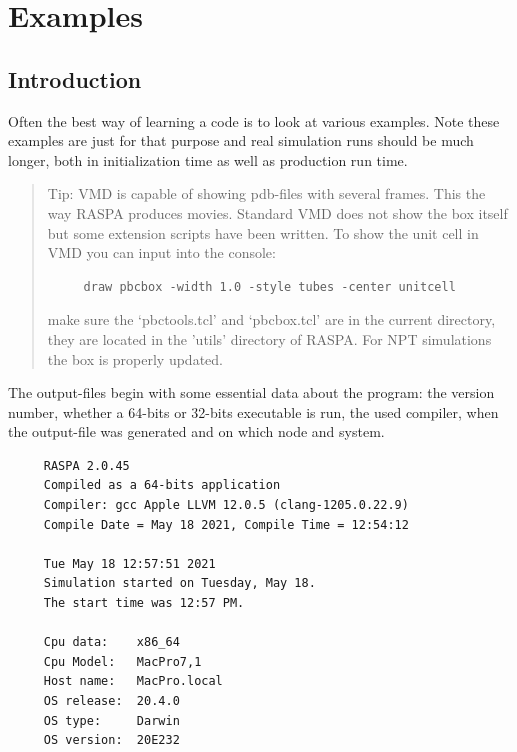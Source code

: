 \chapter{Examples\label{Examples: chapter}}

\section{Introduction}

Often the best way of learning a code is to look at various examples. Note these examples are just for that purpose
and real simulation runs should be much longer, both in initialization time as well as production run time.

\begin{quote}
Tip: VMD is capable of showing pdb-files with several frames. This the way RASPA produces movies. Standard VMD does
not show the box itself but some extension scripts have been written. To show the unit cell in VMD you can
input into the console:
\begin{verbatim}
     draw pbcbox -width 1.0 -style tubes -center unitcell
\end{verbatim}
make sure the `pbctools.tcl' and `pbcbox.tcl' are in the current directory, they are located in the 'utils' directory of RASPA.
For NPT simulations the box is properly updated.
\end{quote}

The output-files begin with some essential data about the program: the version number, whether a 64-bits or 32-bits executable is run,
the used compiler, when the output-file was generated and on which node and system.
\begin{verbatim}
     RASPA 2.0.45
     Compiled as a 64-bits application
     Compiler: gcc Apple LLVM 12.0.5 (clang-1205.0.22.9)
     Compile Date = May 18 2021, Compile Time = 12:54:12
     
     Tue May 18 12:57:51 2021
     Simulation started on Tuesday, May 18.
     The start time was 12:57 PM.
     
     Cpu data:    x86_64
     Cpu Model:   MacPro7,1
     Host name:   MacPro.local
     OS release:  20.4.0
     OS type:     Darwin
     OS version:  20E232
\end{verbatim}


